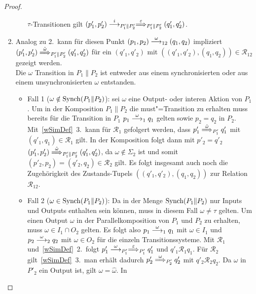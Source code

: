 \begin{proof}
\begin{enumerate}
\begin{itemize}
          $\tau$-Transitionen gilt $(p'_1,p'_2) \must[i]_{P'_1\|P'_2}
          \weakmust[\varepsilon]_{P'_1\|P'_2} (q'_1,q'_2)$.
      \end{itemize}
    \item Analog zu 2.\ kann für diesen Punkt $(p_1,p_2) \must[\omega]_{12}
      (q_1,q_2)$ impliziert $(p'_1,p'_2) \weakmust[\hat{\omega}]_{P'_1\|P'_2}
      (q'_1,q'_2)$ für ein $(q'_1,q'_2)$ mit $((q'_1,q'_2),(q_1,q_2)) \in
      \mathcal{R}_{12}$ gezeigt werden.\\
      Die $\omega$ Transition in $P_1\|P_2$ ist entweder aus einem
      synchronisierten oder aus einem unsynchronisierten $\omega$ entstanden.
      \begin{itemize}
        \item Fall 1 ($\omega\notin\mathrm{Synch} (P_1\|P_2)$): \OBdA{} sei $\omega$
          eine Output- oder interen Aktion von $P_1$. Um in der Komposition
          $P_1\|P_2$ die must"=Transition zu erhalten muss bereits für die
          Transition in $P_1$ $p_1 \must[\omega]_1 q_1$ gelten sowie $p_2 =
          q_2$ in $P_2$. Mit~\ref{wSimDef}~3.\ kann für $\mathcal{R}_1$
          gefolgert werden, dass $p'_1 \weakmust[\hat{\omega}]_{P'_1} q'_1$ mit
          $(q'_1,q_1)\in\mathcal{R}_1$ gilt. In der Komposition folgt dann mit
          $p'_2=q'_2$ $(p'_1,p'_2) \weakmust[\hat{\omega}]_{P'_1\|P'_2}
          (q'_1,q'_2)$, da $\omega\notin \Sigma _2$ ist und somit $(p'_2,p_2) =
          (q'_2,q_2)\in\mathcal{R}_2$ gilt. Es folgt insgesamt auch noch die
          Zugehörigkeit des Zustands-Tupels $((q'_1,q'_2),(q_1,q_2))$ zur
          Relation $\mathcal{R}_{12}$.
        \item Fall 2 ($\omega\in\mathrm{Synch} (P_1\|P_2)$): Da in der Menge $\mathrm{Synch}
          (P_1\|P_2)$ nur Inputs und Outputs enthalten sein können, muss in
          diesem Fall $\omega\neq\tau$ gelten. Um einen Output $\omega$ in der
          Parallelkomposition von $P_1$ und $P_2$ zu erhalten, muss \oBdA{}
          $\omega\in I_1\cap O_2$ gelten. Es folgt also $p_1\must[\omega]_1
          q_1$ mit $\omega\in I_1$ und $p_2\must[\omega]_2 q_2$ mit $\omega\in
          O_2$ für die einzeln Transitionssysteme. Mit $\mathcal{R}_1$
          und~\ref{wSimDef}~2.\ folgt $p'_1\must[\omega]_{P'_1}
          \weakmust[\varepsilon]_{P'_1} q'_1$ und $q'_1\mathcal{R}_1 q_1$. Für
          $\mathcal{R}_2$ gilt~\ref{wSimDef}~3.\, man erhält dadurch $p'_2
          \weakmust[\omega]_{P'_2} q'_2$ mit $q'_2\mathcal{R}_2 q_2$. Da
          $\omega$ in $P'_2$ ein Output ist, gilt $\omega =\hat{\omega}$. In

\end{itemize}
\end{enumerate}
\end{proof}
